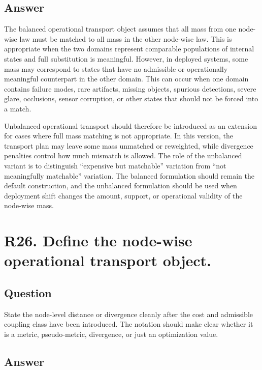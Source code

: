 \documentclass[11pt,a4paper]{article}
\begin{document}
\subsection*{Answer}

The balanced operational transport object assumes that all mass from one node-wise law must be matched to all mass in the other node-wise law. This is appropriate when the two domains represent comparable populations of internal states and full substitution is meaningful. However, in deployed systems, some mass may correspond to states that have no admissible or operationally meaningful counterpart in the other domain. This can occur when one domain contains failure modes, rare artifacts, missing objects, spurious detections, severe glare, occlusions, sensor corruption, or other states that should not be forced into a match.

Unbalanced operational transport should therefore be introduced as an extension for cases where full mass matching is not appropriate. In this version, the transport plan may leave some mass unmatched or reweighted, while divergence penalties control how much mismatch is allowed. The role of the unbalanced variant is to distinguish ``expensive but matchable'' variation from ``not meaningfully matchable'' variation. The balanced formulation should remain the default construction, and the unbalanced formulation should be used when deployment shift changes the amount, support, or operational validity of the node-wise mass.

\section*{R26. Define the node-wise operational transport object.}

\subsection*{Question}

State the node-level distance or divergence cleanly after the cost and admissible coupling class have been introduced. The notation should make clear whether it is a metric, pseudo-metric, divergence, or just an optimization value.

\subsection*{Answer}
\end{document}
